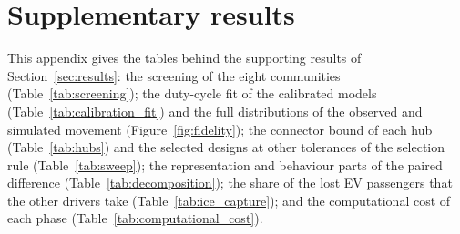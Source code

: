 \section{Supplementary results}
\label{app:supplementary}

This appendix gives the tables behind the supporting results of Section~\ref{sec:results}: the screening of the eight communities (Table~\ref{tab:screening}); the duty-cycle fit of the calibrated models (Table~\ref{tab:calibration_fit}) and the full distributions of the observed and simulated movement (Figure~\ref{fig:fidelity}); the connector bound of each hub (Table~\ref{tab:hubs}) and the selected designs at other tolerances of the selection rule (Table~\ref{tab:sweep}); the representation and behaviour parts of the paired difference (Table~\ref{tab:decomposition}); the share of the lost EV passengers that the other drivers take (Table~\ref{tab:ice_capture}); and the computational cost of each phase (Table~\ref{tab:computational_cost}).

